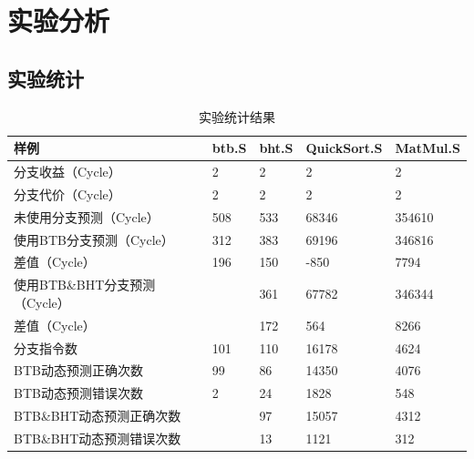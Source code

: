 \documentclass{ctexart}
\begin{document}
\section{\hei 实验分析}
\subsection{\hei 实验统计}


\begin{table}\centering
    
    \begin{tabular}{|l|l|l|l|l|}
        \hline
        样例                          & btb.S & bht.S & QuickSort.S & MatMul.S \\ \hline
        分支收益（Cycle）             & 2     & 2     & 2           & 2        \\ \hline
        分支代价（Cycle）             & 2     & 2     & 2           & 2        \\ \hline
        未使用分支预测（Cycle）       & 508   & 533   & 68346       & 354610   \\ \hline
        使用BTB分支预测（Cycle）      & 312   & 383   & 69196       & 346816   \\ \hline
        差值（Cycle）                 & 196   & 150   & -850        & 7794     \\ \hline
        使用BTB\&BHT分支预测（Cycle） &       & 361   & 67782       & 346344   \\ \hline
        差值（Cycle）                 &       & 172   & 564         & 8266     \\ \hline
        分支指令数                    & 101   & 110   & 16178       & 4624     \\ \hline
        BTB动态预测正确次数           & 99    & 86    & 14350       & 4076     \\ \hline
        BTB动态预测错误次数           & 2     & 24    & 1828        & 548      \\ \hline
        BTB\&BHT动态预测正确次数      &       & 97    & 15057       & 4312     \\ \hline
        BTB\&BHT动态预测错误次数      &       & 13    & 1121        & 312      \\ \hline
    \end{tabular}
    \caption{实验统计结果}
\end{table}
\end{document}
